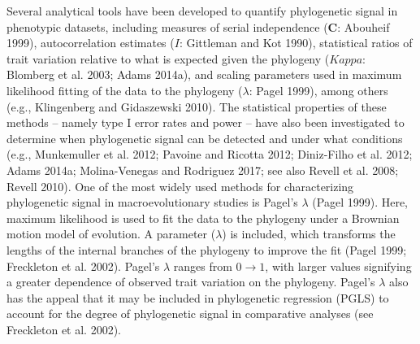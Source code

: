 \documentclass[
]{article}
\begin{document}
Several analytical tools have been developed to quantify phylogenetic
signal in phenotypic datasets, including measures of serial independence
(\(\mathbf{C}\): Abouheif 1999), autocorrelation estimates (\(I\):
Gittleman and Kot 1990), statistical ratios of trait variation relative
to what is expected given the phylogeny (\(Kappa\): Blomberg et al.
2003; Adams 2014a), and scaling parameters used in maximum likelihood
fitting of the data to the phylogeny (\(\lambda\): Pagel 1999), among
others (e.g., Klingenberg and Gidaszewski 2010). The statistical
properties of these methods -- namely type I error rates and power --
have also been investigated to determine when phylogenetic signal can be
detected and under what conditions (e.g., Munkemuller et al. 2012;
Pavoine and Ricotta 2012; Diniz-Filho et al. 2012; Adams 2014a;
Molina-Venegas and Rodriguez 2017; see also Revell et al. 2008; Revell
2010). One of the most widely used methods for characterizing
phylogenetic signal in macroevolutionary studies is Pagel's \(\lambda\)
(Pagel 1999). Here, maximum likelihood is used to fit the data to the
phylogeny under a Brownian motion model of evolution. A parameter
(\(\lambda\)) is included, which transforms the lengths of the internal
branches of the phylogeny to improve the fit (Pagel 1999; Freckleton et
al. 2002). Pagel's \(\lambda\) ranges from \(0\to1\), with larger values
signifying a greater dependence of observed trait variation on the
phylogeny. Pagel's \(\lambda\) also has the appeal that it may be
included in phylogenetic regression (PGLS) to account for the degree of
phylogenetic signal in comparative analyses (see Freckleton et al.
2002). \hfill\break
\end{document}
